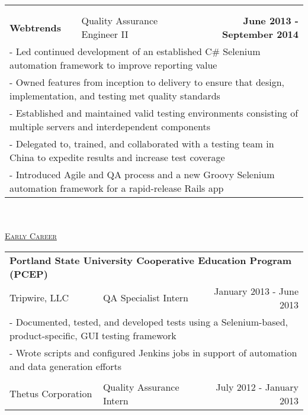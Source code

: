 \documentclass[letterpaper]{article}
\begin{document}
\begin{center}
\begin{tabular}{p{}p{}r}
			\\
			\\
			\\ %
				\textbf{Webtrends}					&
				Quality Assurance Engineer II							&
				\textbf{June 2013 - September 2014 \quad}
			\\
				\multicolumn{3}{p{\textwidth}}{\quad\quad - Led continued development of an established C\# Selenium automation framework to improve reporting value}
			\\
				\multicolumn{3}{p{\textwidth}}{\quad\quad - Owned features from inception to delivery to ensure that design, implementation, and testing met quality standards} 
			\\
				\multicolumn{3}{p{\textwidth}}{\quad\quad - Established and maintained valid testing environments consisting of multiple servers and interdependent components} 
			\\
				\multicolumn{3}{p{\textwidth}}{\quad\quad - Delegated to, trained, and collaborated with a testing team in China to expedite results and increase test coverage}
			\\
				\multicolumn{3}{p{\textwidth}}{\quad\quad - Introduced Agile and QA process and a new Groovy Selenium automation framework for a rapid-release Rails app}  
			\\
		\end{tabular} \\
		\vspace{2.25in} \\
		\underline{\large \scshape Early Career}
		\begin{tabular}{p{}p{}r}
		\\
				\multicolumn{3}{p{0.8\textwidth}}{\textbf{Portland State University Cooperative Education Program (PCEP)}}
			\\
				{\quad Tripwire, LLC}					&
				QA Specialist Intern							&
				{January 2013 - June 2013 \quad\quad}
			\\
				\multicolumn{3}{p{\textwidth}}{\quad\quad - Documented, tested, and developed tests using a Selenium-based, product-specific, GUI testing framework}
			\\
				\multicolumn{3}{p{\textwidth}}{\quad\quad - Wrote scripts and configured Jenkins jobs in support of automation and data generation efforts} 
			\\
			\\
				{\quad Thetus Corporation}					&
				Quality Assurance Intern						&
				{July 2012 - January 2013 \quad\quad}
			\\

\end{tabular}
\end{center}
\end{document}
